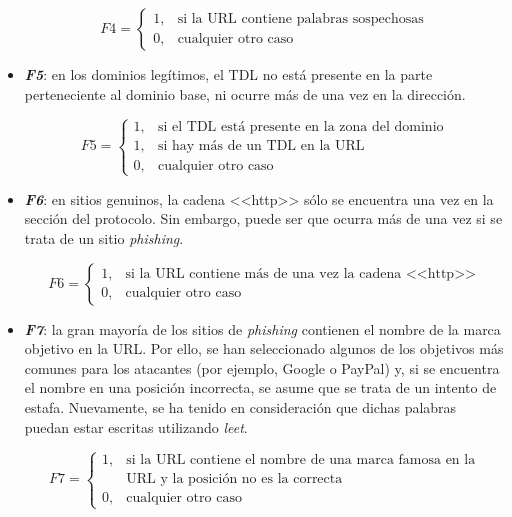 \begin{itemize}
	\[F4 = \left\{ \begin{array}{lr} 1, & \text{si la URL contiene palabras sospechosas}\\ 
		0, & \text{cualquier otro caso} \label{eqn:phishing_f4} \end{array} \right. \]
	
	\item \textit{\textbf{F5}}: en los dominios legítimos, el TDL no está presente en la parte perteneciente al dominio base, ni ocurre más de una vez en la dirección.
	
	\[F5 = \left\{ \begin{array}{lr} 1, & \text{si el TDL está presente en la zona del dominio}\\ 
		1, & \text{si hay más de un TDL en la URL} \\
		0, & \text{cualquier otro caso} \label{eqn:phishing_f5} \end{array} \right. \]
	
	
	\item \textit{\textbf{F6}}: en sitios genuinos, la cadena <<http>> sólo se encuentra una vez en la sección del protocolo. Sin embargo, puede ser que ocurra más de una vez si se trata de un sitio \textit{phishing}.
	
	\[F6 = \left\{ \begin{array}{lr} 1, & \text{si la URL contiene más de una vez la cadena <<http>>}\\ 
		0, & \text{cualquier otro caso} \label{eqn:phishing_f6} \end{array} \right. \]
	
	\item \textit{\textbf{F7}}: la gran mayoría de los sitios de \textit{phishing} contienen el nombre de la marca objetivo en la URL. Por ello, se han seleccionado algunos de los objetivos más comunes para los atacantes (por ejemplo, Google o PayPal) y, si se encuentra el nombre en una posición incorrecta, se asume que se trata de un intento de estafa. Nuevamente, se ha tenido en consideración que dichas palabras puedan estar escritas utilizando \textit{leet}.
	
	\[F7 = \left\{ \begin{array}{lr} 1, & \text{si la URL contiene el nombre de una marca famosa en la}\\ & \text{URL y la posición no es la correcta}\\ 
		0, & \text{cualquier otro caso} \label{eqn:phishing_f7} \end{array} \right. \]
	

\end{itemize}
